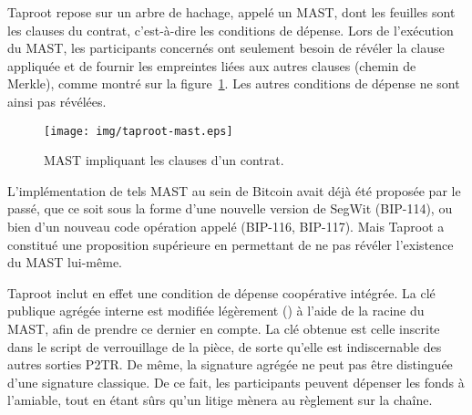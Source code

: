Taproot repose sur un arbre de hachage, appelé un MAST, dont les feuilles sont les clauses du contrat, c'est-à-dire les conditions de dépense. Lors de l'exécution du MAST, les participants concernés ont seulement besoin de révéler la clause appliquée et de fournir les empreintes liées aux autres clauses (chemin de Merkle), comme montré sur la figure~\ref{fig:taproot-mast}. Les autres conditions de dépense ne sont ainsi pas révélées.

\begin{figure}[h]
  \centering
  \texttt{[image: img/taproot-mast.eps]}
  \caption{MAST impliquant les clauses d'un contrat.}
  \label{fig:taproot-mast}
\end{figure}

L'implémentation de tels MAST au sein de Bitcoin avait déjà été proposée par le passé, que ce soit sous la forme d'une nouvelle version de SegWit (BIP-114), ou bien d'un nouveau code opération appelé  (BIP-116, BIP-117). Mais Taproot a constitué une proposition supérieure en permettant de ne pas révéler l'existence du MAST lui-même.

Taproot inclut en effet une condition de dépense coopérative intégrée. La clé publique agrégée interne est modifiée légèrement () à l'aide de la racine du MAST, afin de prendre ce dernier en compte. La clé obtenue est celle inscrite dans le script de verrouillage de la pièce, de sorte qu'elle est indiscernable des autres sorties P2TR. De même, la signature agrégée ne peut pas être distinguée d'une signature classique. De ce fait, les participants peuvent dépenser les fonds à l'amiable, tout en étant sûrs qu'un litige mènera au règlement sur la chaîne. %

